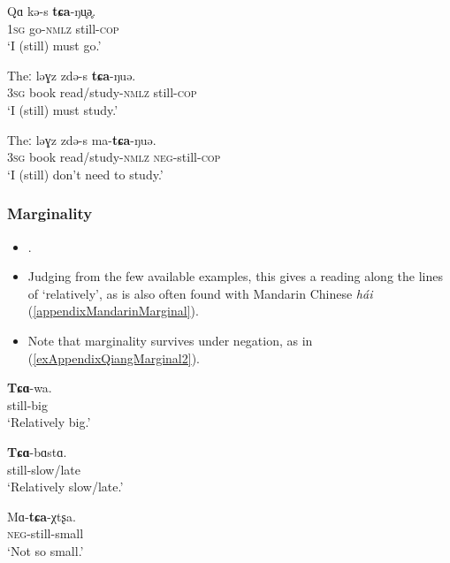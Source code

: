 \begin{exe}
	\ex
	\gll Qɑ kə-s \textbf{tɕa}-ŋu̥ə̥.\\
	1\textsc{sg} go-\textsc{nmlz} still-\textsc{cop}\\
	\glt \lq I (still) must go.' \parencite[194]{LaPollaHuang2003}
	
	\ex
	\gll Theː ləɣz zdə-s \textbf{tɕa}-ŋuə.\\
	3\textsc{sg} book read/study-\textsc{nmlz} still-\textsc{cop}\\
	\glt \lq I (still) must study.' \parencite[194]{LaPollaHuang2003}

	\ex\label{exAppendixQiangFirst3}
	\gll Theː ləɣz zdə-s ma-\textbf{tɕa}-ŋuə.\\
	3\textsc{sg} book read/study-\textsc{nmlz} \textsc{neg}-still-\textsc{cop}\\
	\glt \lq I (still) don't need to study.' \parencite[194]{LaPollaHuang2003}
\end{exe}



\subsubsection{Marginality}
\label{appendixNorthernQiangMarginal}
\begin{itemize}
	\item \textcite[213–214]{LaPollaHuang2003}.
	\item Judging from the few available examples, this gives a reading along the lines of \lq relatively', as is also often found with Mandarin Chinese \textit{hái} (\ref{appendixMandarinMarginal}).
	\item Note that marginality survives under negation, as in (\ref{exAppendixQiangMarginal2}).
\end{itemize}
\begin{exe}
	\ex \gll \textbf{Tɕɑ}-wa.\\
	still-big\\
	\glt \lq Relatively big.' \parencite[214]{LaPollaHuang2003}
	
	\ex
	\gll \textbf{Tɕɑ}-bɑstɑ.\\
	still-slow/late\\
	\glt \lq Relatively slow/late.' \parencite[214]{LaPollaHuang2003}
	
	\ex\label{exAppendixQiangMarginal2}
	\gll Mɑ-\textbf{tɕa}-χtʂa.\\
	\textsc{neg}-still-small\\
	\glt \lq Not so small.'  \parencite[214]{LaPollaHuang2003}
\end{exe}

